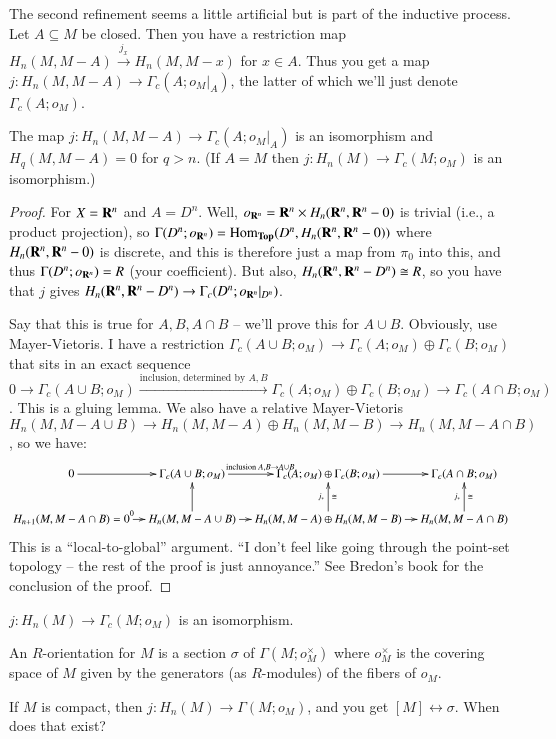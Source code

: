 The second refinement seems a little artificial but is part of the inductive process. Let $A\subseteq M$ be closed. Then you have a restriction map $H_n(M,M-A)\xrightarrow{j_x}H_n(M,M-x)$ for $x\in A$. Thus you get a map $j:H_n(M,M-A)\to \Gamma_c(A;o_M|_{A})$, the latter of which we'll just denote $\Gamma_c(A;o_M)$.
\begin{theorem}
The map $j:H_n(M,M-A)\to \Gamma_c(A;o_M|_{A})$ is an isomorphism and $H_q(M,M-A)=0$ for $q>n$. (If $A=M$ then $j:H_n(M)\to \Gamma_c(M;o_M)$ is an isomorphism.)
\end{theorem}
\begin{proof}
For $X=\mathbf R^n$ and $A=D^n$. Well, $o_{\mathbf R^n}=\mathbf R^n\times H_n(\mathbf R^n,\mathbf R^n-0)$ is trivial (i.e., a product projection), so $\Gamma(D^n;o_{\mathbf R^n})=\operatorname{Hom}_{\mathbf{Top}}(D^n,H_n(\mathbf R^n,\mathbf R^n-0))$ where $H_n(\mathbf R^n,\mathbf R^n-0)$ is discrete, and this is therefore just a map from $\pi_0$ into this, and thus $\Gamma(D^n;o_{\mathbf R^n})=R$ (your coefficient). But also, $H_n(\mathbf R^n,\mathbf R^n-D^n)\cong R$, so you have that $j$ gives $H_n(\mathbf R^n,\mathbf R^n-D^n)\to \Gamma_c(D^n;o_{\mathbf R^n}|_{D^n})$.

Say that this is true for $A,B,A\cap B$ -- we'll prove this for $A\cup B$. Obviously, use Mayer-Vietoris. I have a restriction $\Gamma_c(A\cup B;o_M)\to \Gamma_c(A;o_M)\oplus \Gamma_c(B;o_M)$ that sits in an exact sequence $0\to \Gamma_c(A\cup B;o_M)\xrightarrow{\text{inclusion, determined by }A,B} \Gamma_c(A;o_M)\oplus \Gamma_c(B;o_M)\to \Gamma_c(A\cap B;o_M)$. This is a gluing lemma. We also have a relative Mayer-Vietoris $H_n(M,M-A\cup B)\to H_n(M,M-A)\oplus H_n(M,M-B)\to H_n(M,M-A\cap B)$, so we have:
\begin{align*}
\xymatrix@C=10pt{
	0\ar[r] & \Gamma_c(A\cup B;o_M)\ar[r]^{\text{inclusion }A,B\to A\cup B} & \Gamma_c(A;o_M)\oplus \Gamma_c(B;o_M)\ar[r] & \Gamma_c(A\cap B;o_M)\\
	H_{n+1}(M,M-A\cap B)=0\ar[r]^0 & H_n(M,M-A\cup B)\ar[r]\ar[u] & H_n(M,M-A)\oplus H_n(M,M-B)\ar[r]\ar[u]^{j_\ast}_{\cong} & H_n(M,M-A\cap B)\ar[u]^{j_\ast}_{\cong}
}
\end{align*}
This is a ``local-to-global'' argument. ``I don't feel like going through the point-set topology -- the rest of the proof is just annoyance.'' See Bredon's book for the conclusion of the proof.
\end{proof}
\begin{corollary}
$j:H_n(M)\to \Gamma_c(M;o_M)$ is an isomorphism.
\end{corollary}
\begin{definition}
An $R$-orientation for $M$ is a section $\sigma$ of $\Gamma(M;o_M^\times)$ where $o_M^\times$ is the covering space of $M$ given by the generators (as $R$-modules) of the fibers of $o_M$.
\end{definition}
If $M$ is compact, then $j:H_n(M)\to \Gamma(M;o_M)$, and you get $[M]\leftrightarrow \sigma$. When does that exist?

